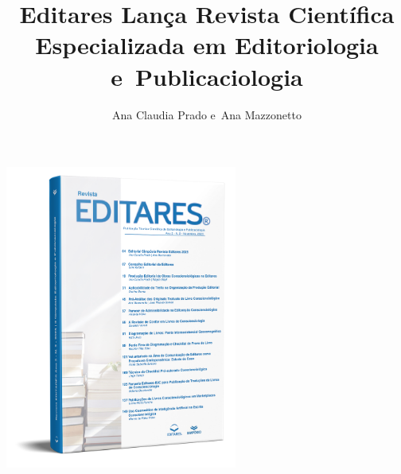 \documentclass{gescons}
\author{Ana Claudia Prado e~Ana Mazzonetto}
\title{Editares Lança Revista Científica Especializada em Editoriologia e~Publicaciologia}
\begin{document}
    \makeentrevistatitle


    
    
\begin{center}
    \includegraphics[height=10cm]{articles/atualizacoes/fotos/materia6/revista_editares_2025.png} 
\end{center}
    
\end{document}
